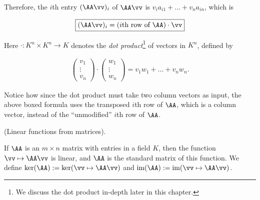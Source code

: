 \begin{theorem}
    Therefore, the $i$th entry $(\AA \vv)_i$ of $\AA \vv$ is $v_i a_{i1} + ... + v_n a_{in} $, which is
    
    \begin{align*}
        \boxed
        {
            (\AA \vv)_i = (\text{$i$th row of $\AA$}) \cdot \vv
        }
    \end{align*}

    
    Here $\cdot:K^n \times K^n \rightarrow K$ denotes the \textit{dot product}\footnote{We discuss the dot product in-depth later in this chapter.} of vectors in $K^n$, defined by
    
    \begin{align*}
        \begin{pmatrix} v_1 \\ \vdots \\ v_n \end{pmatrix}
        \cdot
        \begin{pmatrix} w_1 \\ \vdots \\ w_n \end{pmatrix}
        =
        v_1 w_1 + ... + v_n w_n.
    \end{align*}

    Notice how since the dot product must take two column vectors as input, the above boxed formula uses the transposed $i$th row of $\AA$, which is a column vector, instead of the ``unmodified'' $i$th row of $\AA$.
\end{theorem}

\begin{theorem}
    (Linear functions from matrices).
    
    If $\AA$ is an $m \times n$ matrix with entries in a field $K$, then the function $\vv \mapsto \AA \vv$ is linear, and $\AA$ is the standard matrix of this function. We define $\ker(\AA) := \ker(\vv \mapsto \AA \vv)$ and $\im(\AA) := \im(\vv \mapsto \AA \vv)$.
\end{theorem}

